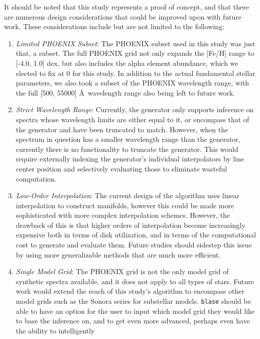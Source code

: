 \documentclass[twocolumn]{aastex631}
\begin{document}
It should be noted that this study represents a proof of concept, and that 
there are numerous design considerations that could be improved upon with 
future work. These considerations include but are not limited to the 
following:
\begin{enumerate}[label=-]
    \item \textit{Limited PHOENIX Subset}: The PHOENIX subset used in this 
    study was just that, a subset. The full PHOENIX grid not only expands 
    the [Fe/H] range to [-4.0, 1.0] dex, but also includes the alpha element 
    abundance, which we elected to fix at 0 for this study. In addition to 
    the actual fundamental stellar parameters, we also took a subset of the 
    PHOENIX wavelength range, with the full [500, 55000] \AA \ wavelength 
    range also being left to future work.
    \item \textit{Strict Wavelength Range}: Currently, the generator only 
    supports inference on spectra whose wavelength limits are either equal 
    to it, or encompass that of the generator and have been truncated to 
    match. However, when the spectrum in question has a smaller wavelength 
    range than the generator, currently there is no functionality to truncate 
    the generator. This would require externally indexing the generator's 
    individual interpolators by line center position and selectively
    evaluating those to eliminate wasteful computation.
    \item \textit{Low-Order Interpolation}: The current design of the 
    algorithm uses linear interpolation to construct manifolds, however this
    could be made more sophisticated with more complex interpolation schemes.
    However, the drawback of this is that higher orders of interpolation
    become increasingly expensive both in terms of disk utilization, and 
    in terms of the computational cost to generate and evaluate them. Future
    studies should sidestep this issue by using more generalizable methods
    that are much more efficient.
    \item \textit{Single Model Grid}: The PHOENIX grid is not the only model
    grid of synthetic spectra available, and it does not apply to all types 
    of stars. Future work would extend the reach of this study's algorithm 
    to encompass other model grids such as the Sonora series for substellar
    models. \texttt{blase} should be able to have an option for the user to 
    input which model grid they would like to base the inference on, and 
    to get even more advanced, perhaps even have the ability to intelligently

\end{enumerate}
\end{document}
